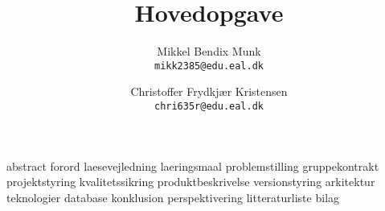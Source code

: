 \documentclass[a4paper, 11pt, danish]{report}
\title{Hovedopgave}
\author{
    Mikkel Bendix Munk\\
    \texttt{mikk2385@edu.eal.dk}
    \and
    Christoffer Frydkjær Kristensen\\
    \texttt{chri635r@edu.eal.dk}
}
\begin{document}
\maketitle
\tableofcontents{}
\newpage
{abstract}
{forord}
{laesevejledning}
{laeringsmaal}
{problemstilling}
{gruppekontrakt}
{projektstyring}
{kvalitetssikring}
{produktbeskrivelse}
{versionstyring}
{arkitektur}
{teknologier}
{database}
{konklusion}
{perspektivering}
{litteraturliste}
{bilag}
\end{document}
